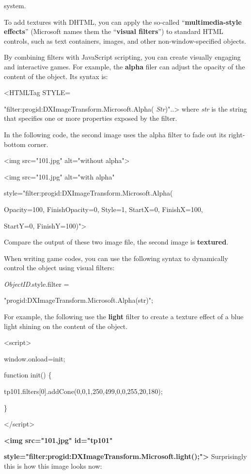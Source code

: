 \documentclass[
]{article}
\begin{document}
system.

To add textures with DHTML, you can apply the so-called
``\textbf{multimedia-style effects}'' (Microsoft names them the
``\textbf{visual filters}'') to standard HTML controls, such as text
containers, images, and other non-window-specified objects.

By combining filters with JavaScript scripting, you can create visually
engaging and interactive games. For example, the \textbf{alpha} filer
can adjust the opacity of the content of the object. Its syntax is:

\textless HTMLTag STYLE=

"filter:progid:DXImageTransform.Microsoft.Alpha(
\emph{Str})"..\textgreater{} where \emph{str} is the string that
specifies one or more properties exposed by the filter.

In the following code, the second image uses the alpha filter to fade
out its right-bottom corner.

\textless img src="101.jpg" alt="without alpha"\textgreater{}

\textless img src="101.jpg" alt="with alpha"

style="filter:progid:DXImageTransform.Microsoft.Alpha(

Opacity=100, FinishOpacity=0, Style=1, StartX=0, FinishX=100,

StartY=0, FinishY=100)"\textgreater{}

Compare the output of these two image file, the second image is
\textbf{textured}.

When writing game codes, you can use the following syntax to dynamically
control the object using visual filters:

\emph{ObjectID}.style.filter =

"progid:DXImageTransform.Microsoft.Alpha(str)";

For example, the following use the \textbf{light} filter to create a
texture effect of a blue light shining on the content of the object.

\textless script\textgreater{}

window.onload=init;

function init() \{

tp101.filters{[}0{]}.addCone(0,0,1,250,499,0,0,255,20,180);

\}

\textless/script\textgreater{}

\textbf{\textless img src="101.jpg" id="tp101"}

\textbf{style="filter:progid:DXImageTransform.Microsoft.light();"\textgreater{}}
Surprisingly this is how this image looks now:
\end{document}

